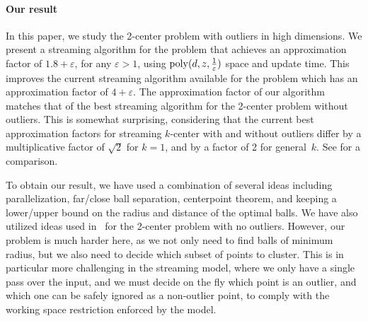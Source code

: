 \documentclass[envcountsame]{cls/cccg15}
\renewcommand{\O}{\ensuremath{{O}}}
\newcommand{\poly}{\mathop{\mathrm{poly}}}
\newcommand{\eps}{\varepsilon}
\newcommand{\REM}[1]{}
\begin{document}
\paragraph{Our result}
In this paper, we study the 2-center problem with outliers in high dimensions.
We present a streaming algorithm for the problem that achieves
an approximation factor of $1.8 + \eps$, for any $\eps > 1$,
using $\poly(d, z, {1 \over \eps})$ space and update time.
This improves the current streaming algorithm available for the problem
which has an approximation factor of $4+\eps$.
The approximation factor of our algorithm matches
that of the best streaming algorithm for the 2-center problem without outliers.
This is somewhat surprising, considering that 
the current best approximation factors for streaming $k$-center with and without outliers 
differ by a multiplicative factor of $\sqrt{2}$ for $k=1$,
and by a factor of 2  for general~$k$. %
See  for a comparison.

To obtain our result, we have used a combination of several ideas
including parallelization, far/close ball separation, centerpoint theorem,
and keeping a lower/upper bound on the radius and distance of the optimal balls.
We have also utilized ideas used in~\cite{kim2014improved} 
for the 2-center problem with no outliers.
However, our problem is much harder here, %
as we not only need to find balls of minimum radius, 
but we also need to decide which subset of points to cluster.
This is in particular more challenging in the streaming model,
where we only have a single pass over the input, and we must decide on the fly
which point is an outlier, 
and which one can be safely ignored as a non-outlier point,
to comply with the working space restriction enforced by the model.


\REM{
The rest of this paper is organized as follows.
In Section~\ref{sec:1-center}, we give a simple $2$-approximation algorithm for 
the 1-center problem with outliers that uses $\O(z^2 + zd)$ space.
In the next section, we show a $(1.8 + \eps)$-approximation
streaming algorithm for 2-center with $z$ outliers in high dimensions. 
}


\end{document}

